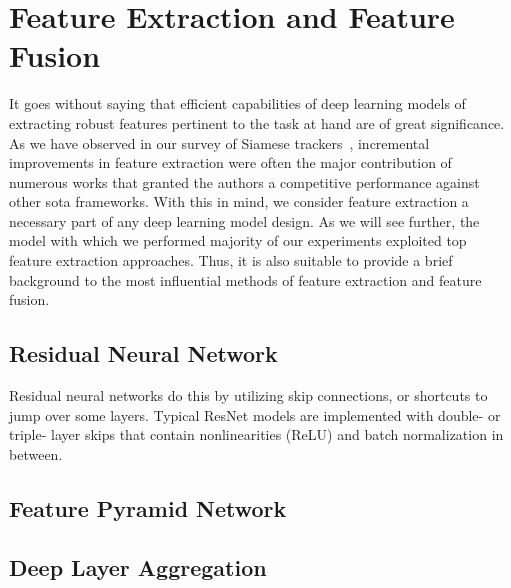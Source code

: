 \section{Feature Extraction and Feature Fusion}
\label{sec:FeatureExtractionFusion}

It goes without saying that efficient capabilities of deep learning models of extracting robust features pertinent to the task at hand are of great significance. As we have observed in our survey of Siamese trackers~\cite{ondrasovic2021siamese}, incremental improvements in feature extraction were often the major contribution of numerous works that granted the authors a competitive performance against other \gls{sota} frameworks. With this in mind, we consider feature extraction a necessary part of any deep learning model design. As we will see further, the model with which we performed majority of our experiments exploited top feature extraction approaches. Thus, it is also suitable to provide a brief background to the most influential methods of feature extraction and feature fusion.

\subsection{Residual Neural Network}
\label{ssec:ResidualNeuralNet}

Residual neural networks do this by utilizing skip connections, or shortcuts to jump over some layers. Typical ResNet models are implemented with double- or triple- layer skips that contain nonlinearities (ReLU) and batch normalization in between.
\subsection{Feature Pyramid Network}
\label{ssec:FeaturePyramidNetwork}

\subsection{Deep Layer Aggregation}
\label{ssec:DeepLayerAggregation}
